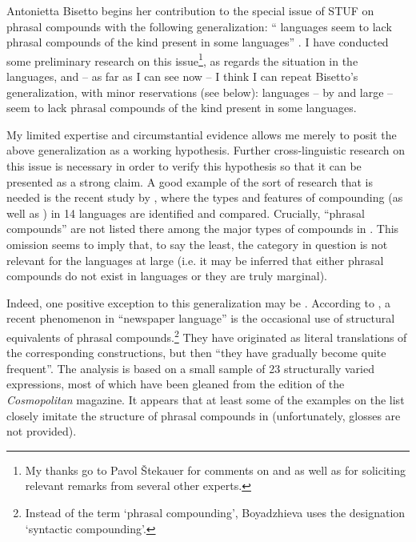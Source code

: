 \documentclass[output=paper]{LSP/langsci}
\begin{document}
{Antonietta Bisetto begins her contribution to the special issue of STUF on phrasal compounds with the following generalization: “ languages seem to lack phrasal compounds of the kind present in some  languages” \citep[395]{Bisetto2015}. I have conducted some preliminary research on this issue}\footnote{{My thanks go to Pavol Štekauer for comments on  and  as well as for soliciting relevant remarks from several other  experts.}}{, as regards the situation in the  languages, and – as far as I can see now – I think I can repeat Bisetto’s generalization, with minor reservations (see below):  languages – by and large –seem to lack phrasal compounds of the kind present in some  languages.}

My limited expertise and circumstantial evidence allows me merely to posit the above generalization as a working hypothesis. Further cross-linguistic research on this issue is necessary in order to verify this hypothesis so that it can be presented as a strong claim. A good example of the sort of research that is needed is the recent study by \citet{Körtvélyessy2016}, where the types and features of compounding (as well as ) in 14  languages are identified and compared. Crucially, “phrasal compounds” are not listed there among the major types of compounds in . This omission seems to imply that, to say the least, the category in question is not relevant for the  languages at large (i.e. it may be inferred that either phrasal compounds do not exist in  languages or they are truly marginal).

{Indeed, one positive exception to this generalization may be . According to \citet{Boyadzhieva2007}, a recent phenomenon in  “newspaper language” is the occasional use of structural equivalents of  phrasal compounds.}\footnote{{Instead of the term ‘phrasal compounding’, Boyadzhieva uses the designation ‘syntactic compounding’.}} {They have originated as literal translations of the corresponding  constructions, but then “they have gradually become quite frequent”. The analysis is based on a small sample of 23 structurally varied expressions, most of which have been gleaned from the  edition of the} {\textit{Cosmopolitan}} {magazine. It appears that at least some of the examples on the list closely imitate the structure of phrasal compounds in  (unfortunately,  glosses are not provided).} 
\end{document}
